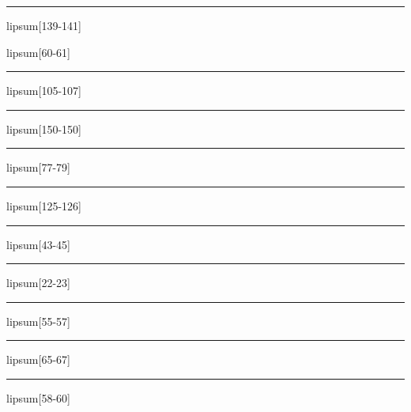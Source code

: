 \documentclass[11pt,a4paper]{article}
\begin{document}
\begin{simplewrap}
  \textcolor{green!55}{\rule{3.9cm}{4.2cm}}
\end{simplewrap}
lipsum[139-141]

lipsum[60-61]

\begin{simplewrap}
  \textcolor{pink!54}{\rule{3.5cm}{3.7cm}}
\end{simplewrap}
lipsum[105-107]

\begin{simplewrap}
  \textcolor{blue!36}{\rule{3.2cm}{8.7cm}}
\end{simplewrap}
lipsum[150-150]

\begin{simplewrap}
  \textcolor{red!58}{\rule{4.7cm}{5.8cm}}
\end{simplewrap}
lipsum[77-79]

\begin{simplewrap}
  \textcolor{olive!44}{\rule{5.2cm}{6.4cm}}
\end{simplewrap}
lipsum[125-126]

\begin{simplewrap}
  \textcolor{olive!41}{\rule{3.1cm}{4.7cm}}
\end{simplewrap}
lipsum[43-45]

\begin{simplewrap}
  \textcolor{purple!49}{\rule{4.6cm}{9.3cm}}
\end{simplewrap}
lipsum[22-23]

\begin{simplewrap}
  \textcolor{purple!39}{\rule{3.5cm}{4.1cm}}
\end{simplewrap}
lipsum[55-57]

\begin{simplewrap}
  \textcolor{brown!58}{\rule{5.6cm}{4.2cm}}
\end{simplewrap}
lipsum[65-67]

\begin{simplewrap}
  \textcolor{red!11}{\rule{5.2cm}{2.4cm}}
\end{simplewrap}
lipsum[58-60]
\end{document}
